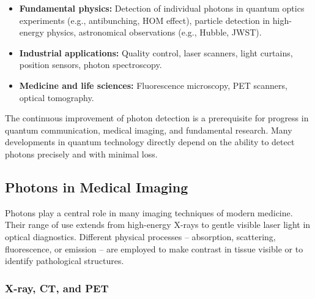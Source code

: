 \begin{itemize}
	\item \textbf{Fundamental physics:} Detection of individual photons in quantum optics experiments (e.g., antibunching, HOM effect), particle detection in high-energy physics, astronomical observations (e.g., Hubble, JWST).
	\item \textbf{Industrial applications:} Quality control, laser scanners, light curtains, position sensors, photon spectroscopy.
	\item \textbf{Medicine and life sciences:} Fluorescence microscopy, PET scanners, optical tomography.
\end{itemize}

\begin{tcolorbox}[hinweisbox, title=Note on the Importance of Detection Technology]
	\label{box:detektionstechnologie}
	The continuous improvement of photon detection is a prerequisite for progress in quantum communication, medical imaging, and fundamental research. Many developments in quantum technology directly depend on the ability to detect photons precisely and with minimal loss.
\end{tcolorbox}
\subsection{Photons in Medical Imaging}

Photons play a central role in many imaging techniques of modern medicine. Their range of use extends from high-energy X-rays to gentle visible laser light in optical diagnostics. Different physical processes – absorption, scattering, fluorescence, or emission – are employed to make contrast in tissue visible or to identify pathological structures.

\subsubsection{X-ray, CT, and PET}

